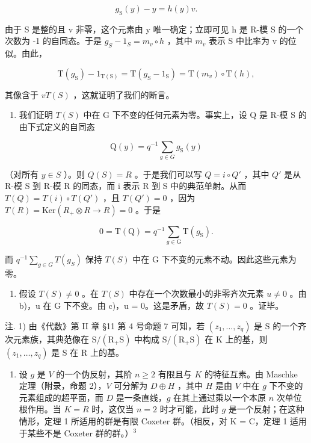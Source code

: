 \[
g _ {\mathrm{S}} (y) - y = h (y) v.
\]

由于 S 是整的且 v 非零，这个元素由 y 唯一确定；立即可见 h 是 R-模 S 的一个次数为 -1 的自同态。于是 \(g_{S} - 1_{S} = m_{v} \circ h\) ，其中 \(m_{v}\) 表示 S 中比率为 v 的位似。由此，

\[
\mathrm{T} (g _ {\mathrm{S}}) - 1 _ {\mathrm{T(S)}} = \mathrm{T} (g _ {\mathrm{S}} - 1 _ {\mathrm{S}}) = \mathrm{T} (m _ {v}) \circ \mathrm{T} (h),
\]

其像含于 \(vT(S)\) ，这就证明了我们的断言。

\begin{enumerate}
\def\labelenumi{\alph{enumi})}
\setcounter{enumi}{2}
\tightlist
\item
  我们证明 \(T(S)\) 中在 G 下不变的任何元素为零。事实上，设 Q 是 R-模 S 的由下式定义的自同态
\end{enumerate}

\[
\mathrm{Q} (y) = q ^ {- 1} \sum_ {g \in G} g _ {\mathrm{S}} (y)
\]

（对所有 \(y \in S\) ）。则 \(Q(S) = R\) 。于是我们可以写 \(Q = i \circ Q'\) ，其中 \(Q'\) 是从 R-模 S 到 R-模 R 的同态，而 i 表示 R 到 S 中的典范单射。从而 \(T(Q) = T(i) \circ T(Q')\) ，且 \(T(Q') = 0\) ，因为 \(T(R) = \text{Ker}(R_{+} \otimes R \to R) = 0\) 。于是

\[
0 = \mathrm{T} (\mathrm{Q}) = q ^ {- 1} \sum_ {g \in \mathrm{G}} \mathrm{T} (g _ {\mathrm{S}}).
\]

而 \(q^{-1} \sum_{g \in G} T(g_S)\) 保持 \(T(S)\) 中在 G 下不变的元素不动。因此这些元素为零。

\begin{enumerate}
\def\labelenumi{\alph{enumi})}
\setcounter{enumi}{3}
\tightlist
\item
  假设 \(T(S) \neq 0\) 。在 \(T(S)\) 中存在一个次数最小的非零齐次元素 \(u \neq 0\) 。由 b)，u 在 G 下不变。由 c)，u = 0。这是矛盾，故 \(T(S) = 0\) 。证毕。
\end{enumerate}

注. 1) 由《代数》第 II 章 §11 第 4 号命题 7 可知，若 \((z_{1},\ldots ,z_{q})\) 是 S 的一个齐次元素族，其典范像在 \(\mathrm{S / (R_+S)}\) 中构成 \(\mathrm{S / (R_+S)}\) 在 K 上的基，则 \((z_{1},\ldots ,z_{q})\) 是 S 在 R 上的基。

\begin{enumerate}
\def\labelenumi{\arabic{enumi})}
\setcounter{enumi}{1}
\tightlist
\item
  设 \(g\) 是 \(V\) 的一个伪反射，其阶 \(n \geqslant 2\) 有限且与 \(K\) 的特征互素。由 Maschke 定理（附录，命题 2），\(V\) 可分解为 \(D \oplus H\) ，其中 \(H\) 是由 \(V\) 中在 \(g\) 下不变的元素组成的超平面，而 \(D\) 是一条直线，\(g\) 在其上通过乘以一个本原 \(n\) 次单位根作用。当 \(K = R\) 时，这仅当 \(n = 2\) 时才可能，此时 \(g\) 是一个反射；在这种情形，定理 1 所适用的群是有限 Coxeter 群。（相反，对 K = C，定理 1 适用于某些不是 Coxeter 群的群。）\(^{3}\)
\end{enumerate}

